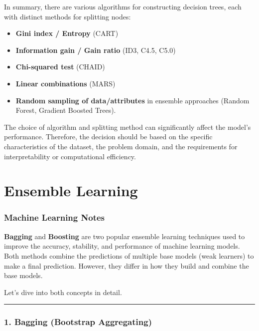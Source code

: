 \documentclass[12pt]{book}
\providecommand{\tightlist}{%
  \setlength{\itemsep}{0pt}\setlength{\parskip}{0pt}}
\begin{document}
In summary, there are various algorithms for constructing decision
trees, each with distinct methods for splitting nodes:

\begin{itemize}
\tightlist
\item
  \textbf{Gini index / Entropy} (CART)
\item
  \textbf{Information gain / Gain ratio} (ID3, C4.5, C5.0)
\item
  \textbf{Chi-squared test} (CHAID)
\item
  \textbf{Linear combinations} (MARS)
\item
  \textbf{Random sampling of data/attributes} in ensemble approaches
  (Random Forest, Gradient Boosted Trees).
\end{itemize}

The choice of algorithm and splitting method can significantly affect
the model's performance. Therefore, the decision should be based on the
specific characteristics of the dataset, the problem domain, and the
requirements for interpretability or computational efficiency.

\chapter{Ensemble Learning}

\subsection{Machine Learning Notes}\label{machine-learning-notes}

\textbf{Bagging} and \textbf{Boosting} are two popular ensemble learning
techniques used to improve the accuracy, stability, and performance of
machine learning models. Both methods combine the predictions of
multiple base models (weak learners) to make a final prediction.
However, they differ in how they build and combine the base models.

Let's dive into both concepts in detail.

\begin{center}\rule{0.5\linewidth}{0.5pt}\end{center}

\subsection{\texorpdfstring{\textbf{1. Bagging (Bootstrap
Aggregating)}}{1. Bagging (Bootstrap Aggregating)}}\label{bagging-bootstrap-aggregating}
\end{document}
